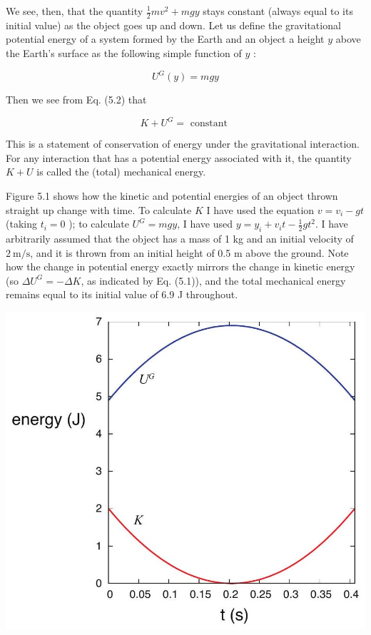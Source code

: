 \documentclass[10pt]{article}
\begin{document}
We see, then, that the quantity $\frac{1}{2} m v^{2}+m g y$ stays constant (always equal to its initial value) as the object goes up and down. Let us define the gravitational potential energy of a system formed by the Earth and an object a height $y$ above the Earth's surface as the following simple function of $y$ :


\begin{equation*}
U^{G}(y)=m g y \tag{5.3}
\end{equation*}


Then we see from Eq. (5.2) that


\begin{equation*}
K+U^{G}=\text { constant } \tag{5.4}
\end{equation*}


This is a statement of conservation of energy under the gravitational interaction. For any interaction that has a potential energy associated with it, the quantity $K+U$ is called the (total) mechanical energy.

Figure 5.1 shows how the kinetic and potential energies of an object thrown straight up change with time. To calculate $K$ I have used the equation $v=v_{i}-g t$ (taking $t_{i}=0$ ); to calculate $U^{G}=m g y$, I have used $y=y_{i}+v_{i} t-\frac{1}{2} g t^{2}$. I have arbitrarily assumed that the object has a mass of 1 kg and an initial velocity of $2 \mathrm{~m} / \mathrm{s}$, and it is thrown from an initial height of 0.5 m above the ground. Note how the change in potential energy exactly mirrors the change in kinetic energy (so $\Delta U^{G}=-\Delta K$, as indicated by Eq. (5.1)), and the total mechanical energy remains equal to its initial value of 6.9 J throughout.

\begin{center}
\includegraphics[max width=\textwidth]{2024_09_14_9969b06773f10b6936e8g-109}
\end{center}
\end{document}

